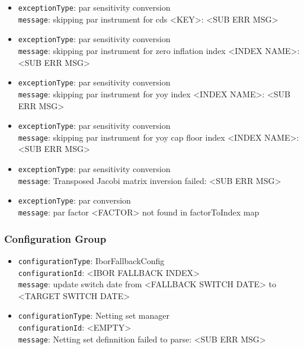\begin{itemize}
  \item \lstinline!exceptionType!: par sensitivity conversion \\
        \lstinline!message!: skipping par instrument for cds <KEY>: <SUB ERR MSG>

  \item \lstinline!exceptionType!: par sensitivity conversion \\
        \lstinline!message!: skipping par instrument for zero inflation index <INDEX NAME>: <SUB ERR MSG>

  \item \lstinline!exceptionType!: par sensitivity conversion \\
        \lstinline!message!: skipping par instrument for yoy index <INDEX NAME>: <SUB ERR MSG>

  \item \lstinline!exceptionType!: par sensitivity conversion \\
        \lstinline!message!: skipping par instrument for yoy cap floor index <INDEX NAME>: <SUB ERR MSG>

  \item \lstinline!exceptionType!: par sensitivity conversion \\
        \lstinline!message!: Transposed Jacobi matrix inversion failed: <SUB ERR MSG>

  \item \lstinline!exceptionType!: par conversion \\
        \lstinline!message!: par factor <FACTOR> not found in factorToIndex map

  \ifdefined\UserGuide
  \else
    
  \fi
\end{itemize}

\subsubsection*{Configuration Group}

\begin{itemize}

  \item \lstinline!configurationType!: IborFallbackConfig \\
        \lstinline!configurationId!: <IBOR FALLBACK INDEX> \\
        \lstinline!message!: update switch date from <FALLBACK SWITCH DATE> to <TARGET SWITCH DATE>

  \item \lstinline!configurationType!: Netting set manager \\
        \lstinline!configurationId!: <EMPTY> \\
        \lstinline!message!: Netting set definnition failed to parse: <SUB ERR MSG>

  \ifdefined\UserGuide
  \else
    
  \fi

\end{itemize}

